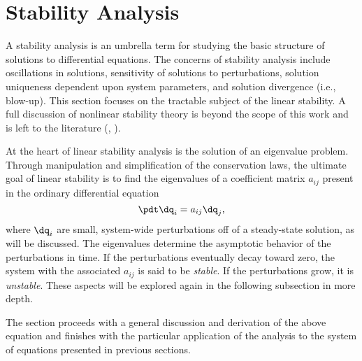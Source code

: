 \section{Stability Analysis}\label{Section:StabilityTheory}
A stability analysis is an umbrella term for studying the basic structure of solutions to differential equations.
The concerns of stability analysis include oscillations in solutions, sensitivity of solutions to perturbations, solution uniqueness dependent upon system parameters, and solution divergence (i.e., blow-up).
This section focuses on the tractable subject of the linear stability.
A full discussion of nonlinear stability theory is beyond the scope of this work and is left to the literature (\eg, \cite{guckenheimer_nonlinear_1983,galaktionov_stability_2004}).

At the heart of linear stability analysis is the solution of an eigenvalue problem.
Through manipulation and simplification of the conservation laws, the ultimate goal of linear stability is to find the eigenvalues of a coefficient matrix $a_{ij}$ present in the ordinary differential equation
\begin{equation}
    \pdt \dq_i = a_{ij} \dq_j,
\end{equation}
where $\dq_i$ are small, system-wide perturbations off of a steady-state solution, as will be discussed.
The eigenvalues determine the asymptotic behavior of the perturbations in time.
If the perturbations eventually decay toward zero, the system with the associated $a_{ij}$ is said to be \emph{stable}.
If the perturbations grow, it is \emph{unstable}.
These aspects will be explored again in the following subsection in more depth.

The section proceeds with a general discussion and derivation of the above equation and finishes with the particular application of the analysis to the system of equations presented in previous sections.




